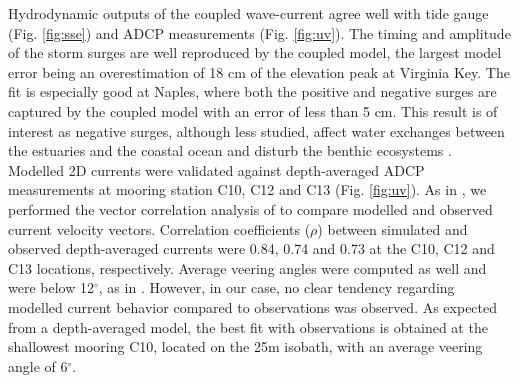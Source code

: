 \documentclass[11pt,a4paper]{article}
\begin{document}
Hydrodynamic outputs of the coupled wave-current agree well with tide gauge (Fig. \ref{fig:sse}) and ADCP measurements (Fig. \ref{fig:uv}). The timing and amplitude of the storm surges are well reproduced by the coupled model, the largest model error being an overestimation of 18 cm of the elevation peak at Virginia Key. The fit is especially good at Naples, where both the positive and negative surges are captured by the coupled model with an error of less than 5 cm. This result is of interest as negative surges, although less studied, affect water exchanges between the estuaries and the coastal ocean and disturb the benthic ecosystems \citep{liu2020impacts}. Modelled 2D currents were validated against depth-averaged ADCP measurements at mooring station C10, C12 and C13 (Fig. \ref{fig:uv}). As in \cite{liu2020impacts}, we performed the vector correlation analysis of \cite{kundu1976ekman} to compare modelled and observed current velocity vectors. Correlation coefficients ($\rho$) between simulated and observed depth-averaged currents were 0.84, 0.74 and 0.73 at the C10, C12 and C13 locations, respectively. Average veering angles were computed as well and were below 12$^\circ$, as in \citep{liu2020impacts}. However, in our case, no clear tendency regarding modelled current behavior compared to observations was observed. As expected from a depth-averaged model, the best fit with observations is obtained at the shallowest mooring C10, located on the 25m isobath, with an average veering angle of 6$^\circ$. 
\end{document}
